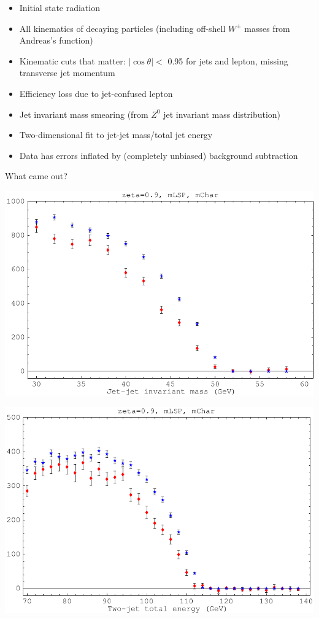 \documentclass[landscape]{article}
\begin{document}
\begin{itemize}

\item Initial state radiation

\item All kinematics of decaying particles (including off-shell $W^\pm$ masses from Andreas's function)

\item Kinematic cuts that matter: $|\cos \theta| <$ 0.95 for jets and lepton, missing transverse jet momentum

\item Efficiency loss due to jet-confused lepton

\item Jet invariant mass smearing (from $Z^0$ jet invariant mass distribution)

\item Two-dimensional fit to jet-jet mass/total jet energy

\item Data has errors inflated by (completely unbiased) background subtraction

\end{itemize}

\pagebreak

What came out?

\vfill

\includegraphics[width=0.5\linewidth]{fakeit_mass.pdf}

\vfill

\includegraphics[width=0.5\linewidth]{fakeit_energy.pdf}

\pagebreak
\end{document}
